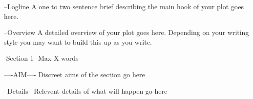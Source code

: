 --Logline
A one to two sentence brief describing the main hook of your plot goes here.

--Overview
A detailed overview of your plot goes here. Depending on your writing style you may want to build this up as you write.

-Section 1-
Max X words

----AIM----
Discreet aims of the section go here

--Details--
Relevent details of what will happen go here
